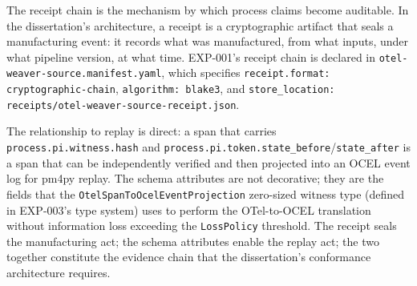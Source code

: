 The receipt chain is the mechanism by which process claims become auditable. In the dissertation's
architecture, a receipt is a cryptographic artifact that seals a manufacturing event: it records
what was manufactured, from what inputs, under what pipeline version, at what time. EXP-001's
receipt chain is declared in \texttt{otel-weaver-source.manifest.yaml}, which specifies
\texttt{receipt.format: cryptographic-chain}, \texttt{algorithm: blake3}, and
\texttt{store\_location: receipts/otel-weaver-source-receipt.json}.

The relationship to replay is direct: a span that carries \texttt{process.pi.witness.hash} and
\texttt{process.pi.token.state\_before}/\texttt{state\_after} is a span that can be independently
verified and then projected into an OCEL event log for pm4py replay. The schema attributes are
not decorative; they are the fields that the \texttt{OtelSpanToOcelEventProjection} zero-sized
witness type (defined in EXP-003's type system) uses to perform the OTel-to-OCEL translation
without information loss exceeding the \texttt{LossPolicy} threshold. The receipt seals the
manufacturing act; the schema attributes enable the replay act; the two together constitute the
evidence chain that the dissertation's conformance architecture requires.
